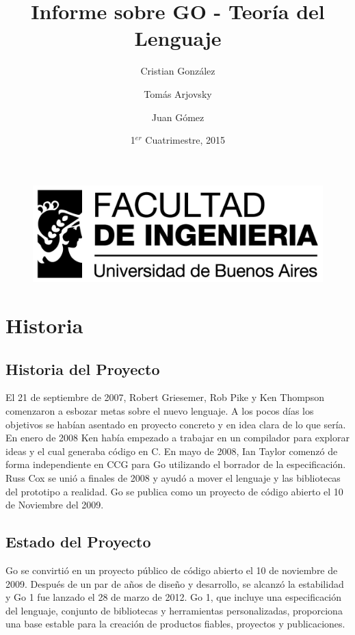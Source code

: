 \documentclass{article}
\begin{document}
\begin{figure}
	\centering
	\includegraphics[width=0.9\linewidth]{./logo_fiuba_alta}
	\label{fig:logo_fiuba_alta}
\end{figure}

\title{Informe sobre GO - Teoría del Lenguaje}
\author{Cristian González \and Tomás Arjovsky \and Juan Gómez}
\date{1$^{er}$ Cuatrimestre, 2015}
\maketitle
\newpage
\tableofcontents
\newpage
\section{Historia}
\subsection{Historia del Proyecto}
El 21 de septiembre de 2007, Robert Griesemer, Rob Pike y Ken Thompson comenzaron a esbozar metas sobre el nuevo lenguaje. A los pocos días los objetivos se habían asentado en proyecto concreto y en idea clara de lo que sería. En enero de 2008 Ken había empezado a trabajar en un compilador para explorar ideas y el cual generaba código en C.
En mayo de 2008, Ian Taylor comenzó de forma independiente en CCG para Go utilizando el borrador de la especificación. Russ Cox se unió a finales de 2008 y ayudó a mover el lenguaje y las bibliotecas del prototipo a realidad.
Go se publica como un proyecto de código abierto el 10 de Noviembre del 2009. 

\subsection{Estado del Proyecto}

Go se convirtió en un proyecto público de código abierto el 10 de noviembre de 2009. Después de un par de años de diseño y desarrollo, se alcanzó la estabilidad y Go 1 fue lanzado el 28 de marzo de 2012. Go 1, que incluye una especificación del lenguaje, conjunto de bibliotecas y herramientas personalizadas, proporciona una base estable para la creación de productos fiables, proyectos y publicaciones. 
\end{document}
